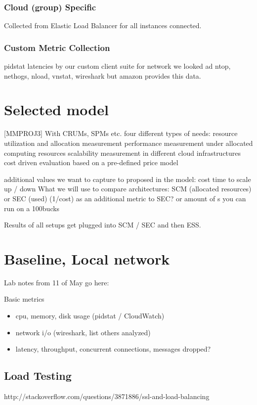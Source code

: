 \documentclass{uvamscse}
\begin{document}
\subsubsection{Cloud (group) Specific}
Collected from Elastic Load Balancer for all instances connected.

\subsubsection{Custom Metric Collection}
pidstat
latencies by our custom client suite
for network we looked ad ntop, nethogs, nload, vnstat, wireshark but amazon provides this data.

\section{Selected model}
[MMPROJ3] With CRUMs, SPMs etc.
four different types of needs:
resource utilization and allocation measurement
performance measurement under allocated computing resources
scalability measurement in different cloud infrastructures
cost driven evaluation based on a pre-defined price model

additional values we want to capture to proposed in the model:
cost
time to scale up / down
What we will use to compare architectures:
SCM (allocated resources) or SEC (used)
(1/cost) as an additional metric to SEC? or amount of s you can run on a 100bucks

Results of all setups get plugged into SCM / SEC and then ESS.

\section{Baseline, Local network}
Lab notes from 11 of May go here:

Basic metrics
\begin{itemize}
  \item cpu, memory, disk usage (pidstat / CloudWatch)
  \item network i/o (wireshark, list others analyzed)
  \item latency, throughput, concurrent connections, messages dropped?
\end{itemize}

\subsection{Load Testing}
http://stackoverflow.com/questions/3871886/ssl-and-load-balancing
\end{document}
